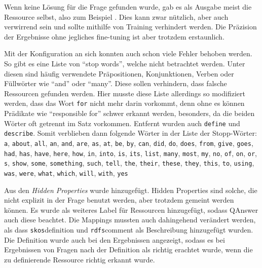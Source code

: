 Wenn keine Lösung für die Frage gefunden wurde, gab es als Ausgabe meist die Ressource selbst, also zum Beispiel .
Dies kann zwar nützlich, aber auch verwirrend sein und sollte mithilfe von Training verhindert werden.
Die Präzision der Ergebnisse ohne jegliches fine-tuning ist aber trotzdem erstaunlich.

Mit der Konfiguration an sich konnten auch schon viele Fehler behoben werden.
So gibt es eine Liste von \enquote{stop words}, welche nicht betrachtet werden.
Unter diesen sind häufig verwendete Präpositionen, Konjunktionen, Verben oder Füllwörter wie \enquote{and} oder \enquote{many}.
Diese sollen verhindern, dass falsche Ressourcen gefunden werden.
Hier musste diese Liste allerdings so modifiziert werden, dass das Wort \texttt{for} nicht mehr darin vorkommt, denn ohne es können Prädikate wie \enquote{responsible for} schwer erkannt werden,
besonders, da die beiden Wörter oft getrennt im Satz vorkommen.
Entfernt wurden auch \texttt{define} und \texttt{describe}.
Somit verblieben dann folgende Wörter in der Liste der Stopp-Wörter:
\texttt{a}, \texttt{about}, \texttt{all}, \texttt{an}, \texttt{and}, \texttt{are}, \texttt{as}, \texttt{at}, \texttt{be}, \texttt{by}, \texttt{can}, \texttt{did}, \texttt{do}, \texttt{does}, \texttt{from}, \texttt{give}, \texttt{goes}, \texttt{had}, \texttt{has}, \texttt{have}, \texttt{here}, \texttt{how}, \texttt{in}, \texttt{into}, \texttt{is}, \texttt{its}, \texttt{list}, \texttt{many}, \texttt{most}, \texttt{my}, \texttt{no}, \texttt{of}, \texttt{on}, \texttt{or}, \texttt{s}, \texttt{show}, \texttt{some}, \texttt{something}, \texttt{such}, \texttt{tell}, \texttt{the}, \texttt{their}, \texttt{these}, \texttt{they}, \texttt{this}, \texttt{to}, \texttt{using}, \texttt{was}, \texttt{were}, \texttt{what}, \texttt{which}, \texttt{will}, \texttt{with}, \texttt{yes}

Aus den \emph{Hidden Properties} wurde  hinzugefügt.
Hidden Properties sind solche, die nicht explizit in der Frage benutzt werden, aber trotzdem gemeint werden können.
Es wurde  als weiteres Label für Ressourcen hinzugefügt, sodass QAnswer auch diese beachtet.
Die Mappings mussten auch dahingehend verändert werden, als dass \texttt{skos}{definition}
und \texttt{rdfs}{comment} als Beschreibung hinzugefügt wurden.
Die Definition wurde auch bei den Ergebnissen angezeigt, sodass es bei Ergebnissen von Fragen nach der Definition als richtig erachtet wurde, wenn die zu definierende Ressource richtig erkannt wurde.

